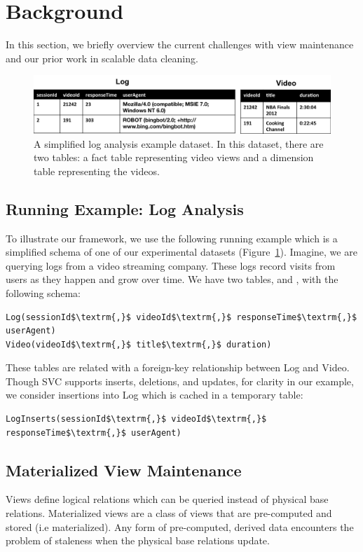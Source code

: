 \section{Background}\label{sec-background}
In this section, we briefly overview the current challenges with view maintenance and
our prior work in scalable data cleaning.

\begin{figure}[ht!] 
\centering
\vspace{-0.75em}
 \includegraphics[width=\columnwidth]{figs/sample-clean-example.png}\vspace{-0.25em}
 \caption{A simplified log analysis example dataset. In this dataset, there are two tables: a fact table representing video views and a dimension table representing the videos.\label{example-1}}
\end{figure}

\subsection{Running Example: Log Analysis}
To illustrate our framework, we use the following running example which is a 
simplified schema of one of our experimental datasets (Figure~\ref{example-1}).
Imagine, we are querying logs from a video streaming company. 
These logs record visits from users as they happen and grow over time.
We have two tables,  and , with the following schema:

\begin{lstlisting}[mathescape]
Log(sessionId$\textrm{,}$ videoId$\textrm{,}$ responseTime$\textrm{,}$ userAgent)
Video(videoId$\textrm{,}$ title$\textrm{,}$ duration)
\end{lstlisting}
These tables are related with a foreign-key relationship between
Log and Video.
Though SVC supports inserts, deletions, and updates, for clarity in our example, we consider insertions
into Log which is cached in a temporary table:
\begin{lstlisting}[mathescape]
LogInserts(sessionId$\textrm{,}$ videoId$\textrm{,}$ responseTime$\textrm{,}$ userAgent)
\end{lstlisting}

\subsection{Materialized View Maintenance}\label{subsec-inc}
Views define logical relations which can be queried instead of physical base relations.
Materialized views are a class of views that are pre-computed and stored (i.e materialized).
Any form of pre-computed, derived data encounters the problem of staleness when the physical base relations update.


